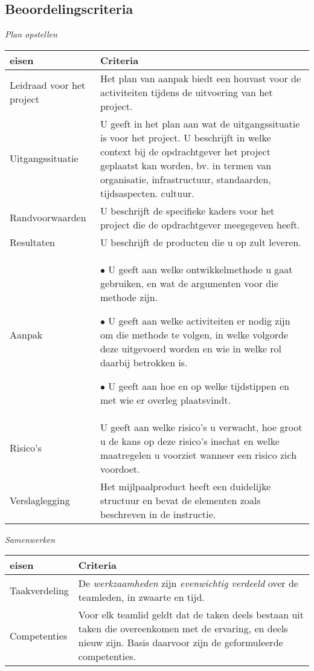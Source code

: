 \subsection{Beoordelingscriteria}
\emph{Plan opstellen}
{\tiny
\begin{center}
\begin{tabular}{|l|p{30em}|}
\hline
{\bf eisen} & {\bf Criteria}\\\hline
Leidraad voor het project &  Het plan van aanpak biedt een houvast  voor de
		    activiteiten tijdens de uitvoering van het project.
	\\\hline
Uitgangssituatie & U geeft in het plan aan wat de uitgangssituatie is voor het
		project. U beschrijft in welke context bij de opdrachtgever het project
		geplaatst kan worden, bv. in termen van organisatie, infrastructuur,
		standaarden, tijdsaspecten. cultuur.
	\\\hline
Randvoorwaarden & U beschrijft de specifieke kaders voor het project die de
		opdrachtgever meegegeven heeft.
	\\\hline
Resultaten & U beschrijft de producten die u op zult leveren.
	\\\hline
Aanpak &
\par $\bullet$ U geeft aan welke ontwikkelmethode u gaat gebruiken, en wat de argumenten voor
	    die methode zijn.
\par $\bullet$ U geeft aan welke activiteiten er nodig zijn om die methode te volgen,
	in welke volgorde deze uitgevoerd worden en wie in welke rol daarbij
	betrokken is.
\par $\bullet$ U geeft aan hoe en op welke tijdstippen en met wie er overleg plaatsvindt.
	\\\hline
Risico's & U geeft aan welke risico's u verwacht, hoe groot u de kans op deze
	    risico's inschat en welke maatregelen u voorziet wanneer een
	    risico zich voordoet.
	\\\hline
Verslaglegging & Het mijlpaalproduct heeft een duidelijke structuur en
		bevat de elementen zoals beschreven in de instructie.
	\\\hline
\end{tabular}
\end{center}
}%

\emph{Samenwerken}

{\tiny
\begin{center}
\begin{tabular}{|l|p{30em}|}
\hline
{\bf eisen} & {\bf Criteria}\\\hline
Taakverdeling & De \emph{werkzaamheden} zijn \emph{evenwichtig verdeeld} over de
			    teamleden, in zwaarte en tijd.
	\\\hline
Competenties & Voor elk teamlid geldt dat de taken deels bestaan uit taken die
			    overeenkomen met de ervaring, en deels nieuw zijn.
			    Basis daarvoor zijn de geformuleerde competenties.
	\\\hline
\end{tabular}
\end{center}
}%